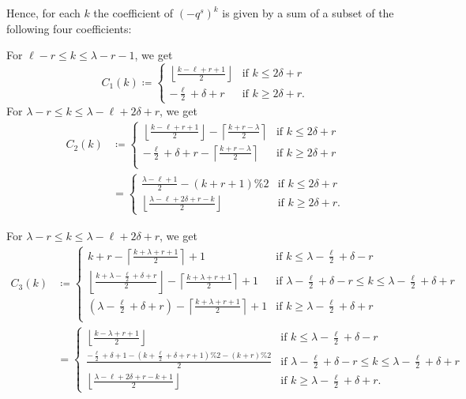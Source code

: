 Hence, for each $k$ the coefficient of $(-q^s)^k$
is given by a sum of a subset of the following four coefficients:
\begin{itemize}
  \ii For $\ell - r \le k \le \lambda - r - 1$, we get
  \[ C_1(k) \coloneqq \begin{cases}
    \left\lfloor \frac{k - \ell + r + 1}{2} \right\rfloor &\text{if } k \le 2 \delta + r \\
    - \frac{\ell}{2} + \delta + r &\text{if } k \ge 2 \delta + r.
    \end{cases} \]
  \ii For $\lambda - r \le k \le \lambda - \ell + 2 \delta + r$, we get
  \begin{align*}
    C_2(k)
    &\coloneqq \begin{cases}
      \left\lfloor \frac{k-\ell+r+1}{2} \right\rfloor - \left\lceil \frac{k+r-\lambda}{2} \right\rceil &\text{if } k \le 2 \delta + r \\
      - \frac{\ell}{2} + \delta + r - \left\lceil \frac{k+r-\lambda}{2} \right\rceil &\text{if } k \ge 2 \delta + r \\
    \end{cases} \\
    &= \begin{cases}
      \frac{\lambda-\ell+1}{2} - (k+r+1)\%2 &\text{if } k \le 2 \delta + r \\
      \left\lfloor \frac{\lambda - \ell + 2\delta + r - k}{2} \right\rfloor &\text{if } k \ge 2 \delta + r.
    \end{cases}
  \end{align*}

  \ii For $\lambda - r \le k \le \lambda - \ell + 2 \delta + r$, we get
  \begin{align*}
    C_3(k)
    &\coloneqq \begin{cases}
      k + r - \left\lceil \frac{k+\lambda+r+1}{2} \right\rceil + 1 &\text{if } k \le \lambda - \frac{\ell}{2} + \delta - r \\
      \left\lfloor \frac{k + \lambda - \frac{\ell}{2} + \delta + r}{2} \right\rfloor - \left\lceil \frac{k+\lambda+r+1}{2} \right\rceil + 1 &\text{if } \lambda - \frac{\ell}{2} + \delta - r \le k \le \lambda - \frac{\ell}{2} + \delta + r \\
      \left( \lambda - \frac{\ell}{2} + \delta + r \right)- \left\lceil \frac{k+\lambda+r+1}{2} \right\rceil + 1 &\text{if } k \ge \lambda - \frac{\ell}{2} + \delta + r \\
    \end{cases} \\
    &= \begin{cases}
      \left\lfloor \frac{k-\lambda+r+1}{2} \right\rfloor &\text{if } k \le \lambda - \frac{\ell}{2} + \delta - r \\
      \frac{- \frac{\ell}{2} + \delta + 1 - (k+\frac{\ell}{2}+\delta+r+1)\%2 -(k+r)\%2}{2} & \text{if } \lambda - \frac{\ell}{2} + \delta - r \le k \le \lambda - \frac{\ell}{2} + \delta + r \\
      \left\lfloor \frac{\lambda - \ell + 2\delta + r - k + 1}{2} \right\rfloor &\text{if } k \ge \lambda - \frac{\ell}{2} + \delta + r.
    \end{cases}
  \end{align*}


\end{itemize}
